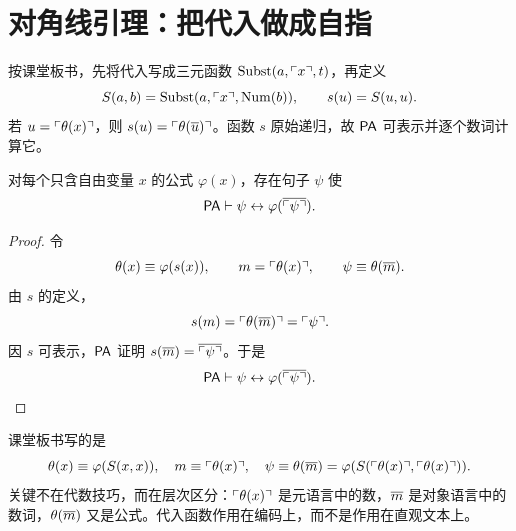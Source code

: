 \section{对角线引理：把代入做成自指}\label{sec:diagonal}

\begin{definition}[自代入函数]\label{def:self-substitution}
按课堂板书，先将代入写成三元函数 \(\mathrm{Subst}(a,\ulcorner x\urcorner,t)\)，再定义
\[
S(a,b)=\mathrm{Subst}(a,\ulcorner x\urcorner,\mathrm{Num}(b)),\qquad s(u)=S(u,u).
\]
若 \(u=\ulcorner \theta(x)\urcorner\)，则 \(s(u)=\ulcorner \theta(\overline{u})\urcorner\)。函数 \(s\) 原始递归，故 \(\mathsf{PA}\) 可表示并逐个数词计算它。
\end{definition}

\begin{theorem}[对角线引理]\label{thm:diagonal}
对每个只含自由变量 \(x\) 的公式 \(\varphi(x)\)，存在句子 \(\psi\) 使
\[
\mathsf{PA}\vdash \psi\leftrightarrow \varphi(\overline{\ulcorner \psi\urcorner}).
\]
\end{theorem}

\begin{proof}
令
\[
\theta(x)\equiv \varphi(s(x)),\qquad
m=\ulcorner \theta(x)\urcorner,\qquad
\psi\equiv\theta(\overline{m}).
\]
由 \(s\) 的定义，
\[
s(m)=\ulcorner \theta(\overline{m})\urcorner=\ulcorner \psi\urcorner.
\]
因 \(s\) 可表示，\(\mathsf{PA}\) 证明 \(s(\overline{m})=\overline{\ulcorner \psi\urcorner}\)。于是
\[
\mathsf{PA}\vdash \psi\leftrightarrow \varphi(\overline{\ulcorner \psi\urcorner}).
\]
\end{proof}

\begin{remark}[与课堂板书写法的对应]\label{rem:blackboard-diagonal}
课堂板书写的是
\[
\theta(x)\equiv\varphi(S(x,x)),\quad
m\equiv\ulcorner \theta(x)\urcorner,\quad
\psi\equiv\theta(\overline{m})
=\varphi(S(\ulcorner \theta(x)\urcorner,\ulcorner \theta(x)\urcorner)).
\]
关键不在代数技巧，而在层次区分：\(\ulcorner \theta(x)\urcorner\) 是元语言中的数，\(\overline{m}\) 是对象语言中的数词，\(\theta(\overline{m})\) 又是公式。代入函数作用在编码上，而不是作用在直观文本上。
\end{remark}
